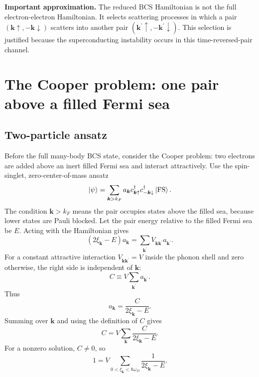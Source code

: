 \documentclass[11pt]{article}
\numberwithin{equation}{section}
\newcommand{\kvec}{\bm{k}}
\newcommand{\kvecp}{\bm{k}^{\prime}}
\begin{document}
\begin{notebox}
\textbf{Important approximation.} The reduced BCS Hamiltonian is not the full electron-electron Hamiltonian. It selects scattering processes in which a pair $(\kvec\uparrow,-\kvec\downarrow)$ scatters into another pair $(\kvecp\uparrow,-\kvecp\downarrow)$. This selection is justified because the superconducting instability occurs in this time-reversed-pair channel.
\end{notebox}

\section{The Cooper problem: one pair above a filled Fermi sea}

\subsection{Two-particle ansatz}

Before the full many-body BCS state, consider the Cooper problem: two electrons are added above an inert filled Fermi sea and interact attractively. Use the spin-singlet, zero-center-of-mass ansatz
\begin{equation}
\ket{\psi}=\sum_{\kvec>k_F} a_{\kvec} c_{\kvec\uparrow}^{\dagger}c_{-\kvec\downarrow}^{\dagger}\ket{\mathrm{FS}}.
\end{equation}
The condition $\kvec>k_F$ means the pair occupies states above the filled sea, because lower states are Pauli blocked. Let the pair energy relative to the filled Fermi sea be $E$. Acting with the Hamiltonian gives
\begin{equation}
(2\xi_{\kvec}-E)a_{\kvec}=\sum_{\kvecp}V_{\kvec\kvecp}a_{\kvecp}.
\end{equation}
For a constant attractive interaction $V_{\kvec\kvecp}=V$ inside the phonon shell and zero otherwise, the right side is independent of $\kvec$:
\begin{equation}
C\equiv V\sum_{\kvecp}a_{\kvecp}.
\end{equation}
Thus
\begin{equation}
a_{\kvec}=\frac{C}{2\xi_{\kvec}-E}.
\end{equation}
Summing over $\kvec$ and using the definition of $C$ gives
\begin{equation}
C=V\sum_{\kvec} \frac{C}{2\xi_{\kvec}-E}.
\end{equation}
For a nonzero solution, $C\ne 0$, so
\begin{equation}
1=V\sum_{0<\xi_{\kvec}<\hbar\omega_D}\frac{1}{2\xi_{\kvec}-E}.
\end{equation}
\end{document}
